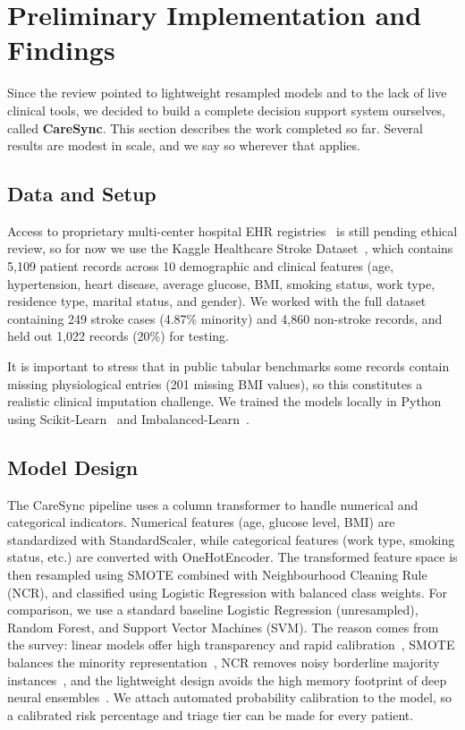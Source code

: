 \documentclass[10pt,twocolumn,a4paper]{article}
\begin{document}
\section{Preliminary Implementation and Findings}
\label{sec:implementation}
Since the review pointed to lightweight resampled models and to the lack of live clinical tools, we decided to build a complete decision support system ourselves, called \textbf{CareSync}. This section describes the work completed so far. Several results are modest in scale, and we say so wherever that applies.

\subsection{Data and Setup}
Access to proprietary multi-center hospital EHR registries~\cite{who2024, aha2024} is still pending ethical review, so for now we use the Kaggle Healthcare Stroke Dataset~\cite{kaggleStroke}, which contains 5,109 patient records across 10 demographic and clinical features (age, hypertension, heart disease, average glucose, BMI, smoking status, work type, residence type, marital status, and gender). We worked with the full dataset containing 249 stroke cases (4.87\% minority) and 4,860 non-stroke records, and held out 1,022 records (20\%) for testing.

It is important to stress that in public tabular benchmarks some records contain missing physiological entries (201 missing BMI values), so this constitutes a realistic clinical imputation challenge. We trained the models locally in Python using Scikit-Learn~\cite{pedregosa2011} and Imbalanced-Learn~\cite{lemaitre2017}.

\subsection{Model Design}
The CareSync pipeline uses a column transformer to handle numerical and categorical indicators. Numerical features (age, glucose level, BMI) are standardized with StandardScaler, while categorical features (work type, smoking status, etc.) are converted with OneHotEncoder. The transformed feature space is then resampled using SMOTE combined with Neighbourhood Cleaning Rule (NCR), and classified using Logistic Regression with balanced class weights. For comparison, we use a standard baseline Logistic Regression (unresampled), Random Forest, and Support Vector Machines (SVM). The reason comes from the survey: linear models offer high transparency and rapid calibration~\cite{kothadiya2023}, SMOTE balances the minority representation~\cite{chawla2002}, NCR removes noisy borderline majority instances~\cite{laurikkala2001}, and the lightweight design avoids the high memory footprint of deep neural ensembles~\cite{treveil2020}. We attach automated probability calibration to the model, so a calibrated risk percentage and triage tier can be made for every patient.
\end{document}
